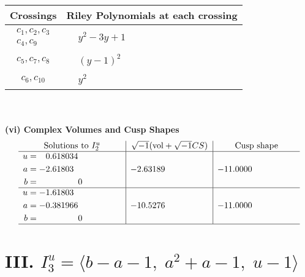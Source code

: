 \documentclass[1p]{elsarticle_modified}
\theoremstyle{definition}
\newcommand{\I}{\sqrt{-1}}
\begin{document}
\begin{tabular}{m{50pt}|m{274pt}}
Crossings & \hspace{64pt}Riley Polynomials at each crossing \\
\hline $$\begin{aligned}c_{1},c_{2},c_{3}\\c_{4},c_{9}\end{aligned}$$&$\begin{aligned}
&y^2-3 y+1
\end{aligned}$\\
\hline $$\begin{aligned}c_{5},c_{7},c_{8}\end{aligned}$$&$\begin{aligned}
&(y-1)^2
\end{aligned}$\\
\hline $$\begin{aligned}c_{6},c_{10}\end{aligned}$$&$\begin{aligned}
&y^2
\end{aligned}$\\
\hline
\end{tabular}\\~\\
\newpage\flushleft \textbf{(vi) Complex Volumes and Cusp Shapes}
$$\begin{array}{c|c|c}  
\text{Solutions to }I^u_{2}& \I (\text{vol} + \sqrt{-1}CS) & \text{Cusp shape}\\
 \hline 
\begin{aligned}
u &= \phantom{-}0.618034\phantom{ +0.000000I} \\
a &= -2.61803\phantom{ +0.000000I} \\
b &= \phantom{-0.000000 } 0\end{aligned}
 & -2.63189\phantom{ +0.000000I} & -11.0000\phantom{ +0.000000I} \\ \hline\begin{aligned}
u &= -1.61803\phantom{ +0.000000I} \\
a &= -0.381966\phantom{ +0.000000I} \\
b &= \phantom{-0.000000 } 0\end{aligned}
 & -10.5276\phantom{ +0.000000I} & -11.0000\phantom{ +0.000000I}\\
 \hline 
 \end{array}$$\newpage\newpage\renewcommand{\arraystretch}{1}
\centering \section*{III. $I^u_{3}= \langle b- a-1,\;a^2+a-1,\;u-1 \rangle$}
\end{document}
